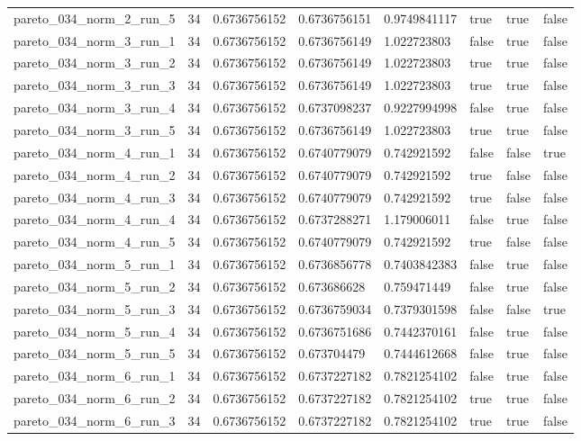 \begin{tabular}{@{}llllllll@{}}
pareto\_034\_norm\_2\_run\_5 & 34 & 0.6736756152 & 0.6736756151 & 0.9749841117 & true & true & false \\
pareto\_034\_norm\_3\_run\_1 & 34 & 0.6736756152 & 0.6736756149 & 1.022723803 & false & true & false \\
pareto\_034\_norm\_3\_run\_2 & 34 & 0.6736756152 & 0.6736756149 & 1.022723803 & true & true & false \\
pareto\_034\_norm\_3\_run\_3 & 34 & 0.6736756152 & 0.6736756149 & 1.022723803 & true & true & false \\
pareto\_034\_norm\_3\_run\_4 & 34 & 0.6736756152 & 0.6737098237 & 0.9227994998 & false & true & false \\
pareto\_034\_norm\_3\_run\_5 & 34 & 0.6736756152 & 0.6736756149 & 1.022723803 & true & true & false \\
pareto\_034\_norm\_4\_run\_1 & 34 & 0.6736756152 & 0.6740779079 & 0.742921592 & false & false & true \\
pareto\_034\_norm\_4\_run\_2 & 34 & 0.6736756152 & 0.6740779079 & 0.742921592 & true & false & false \\
pareto\_034\_norm\_4\_run\_3 & 34 & 0.6736756152 & 0.6740779079 & 0.742921592 & true & false & false \\
pareto\_034\_norm\_4\_run\_4 & 34 & 0.6736756152 & 0.6737288271 & 1.179006011 & false & true & false \\
pareto\_034\_norm\_4\_run\_5 & 34 & 0.6736756152 & 0.6740779079 & 0.742921592 & true & false & false \\
pareto\_034\_norm\_5\_run\_1 & 34 & 0.6736756152 & 0.6736856778 & 0.7403842383 & false & true & false \\
pareto\_034\_norm\_5\_run\_2 & 34 & 0.6736756152 & 0.673686628 & 0.759471449 & false & true & false \\
pareto\_034\_norm\_5\_run\_3 & 34 & 0.6736756152 & 0.6736759034 & 0.7379301598 & false & false & true \\
pareto\_034\_norm\_5\_run\_4 & 34 & 0.6736756152 & 0.6736751686 & 0.7442370161 & false & true & false \\
pareto\_034\_norm\_5\_run\_5 & 34 & 0.6736756152 & 0.673704479 & 0.7444612668 & false & true & false \\
pareto\_034\_norm\_6\_run\_1 & 34 & 0.6736756152 & 0.6737227182 & 0.7821254102 & false & true & false \\
pareto\_034\_norm\_6\_run\_2 & 34 & 0.6736756152 & 0.6737227182 & 0.7821254102 & true & true & false \\
pareto\_034\_norm\_6\_run\_3 & 34 & 0.6736756152 & 0.6737227182 & 0.7821254102 & true & true & false \\

\end{tabular}
